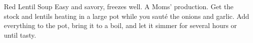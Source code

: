 \begin{recipe}{Red Lentil Soup}{}{}
\freeform Easy and savory, freezes well. A Moms' production.
Get the stock and lentils heating in a large pot while you sauté the onions and garlic. Add everything to the pot, bring it to a boil, and let it simmer for several hours or until tasty.
\end{recipe}
